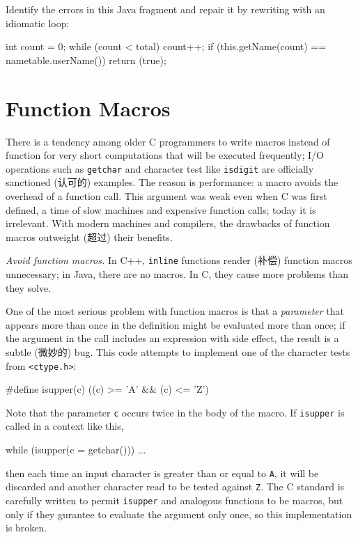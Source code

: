 \begin{exercise}
    Identify the errors in this Java fragment and repair it by rewriting
    with an idiomatic loop:
    \begin{badcode}
        int count = 0;
        while (count < total) {
            count++;
            if (this.getName(count) == nametable.userName()) {
                return (true);
            }
        }
    \end{badcode}
\end{exercise}

\section{Function Macros}
\label{sec:func_mac}
There is a tendency among older C programmers to write macros instead of
function for very short computations that will be executed frequently; I/O
operations such as \verb'getchar' and character test like \verb'isdigit'
are officially sanctioned (认可的) examples. The reason is performance: a
macro avoids the overhead of a function call. This argument was weak even
when C was first defined, a time of slow machines and expensive function
calls; today it is irrelevant. With modern machines and compilers, the
drawbacks of function macros outweight (超过) their benefits.

\emph{Avoid function macros.} In C++, \verb'inline' functions render (补偿)
function macros unnecessary; in Java, there are no macros. In C, they cause
more problems than they solve.

One of the most serious problem with function macros is that a
\textit{parameter} that appears more than once in the definition might be
evaluated more than once; if the argument in the call includes an
expression with side effect, the result is a subtle (微妙的) bug. This code
attempts to implement one of the character tests from \verb'<ctype.h>':
\begin{badcode}
    #define isupper(c) ((c) >= 'A' && (c) <= 'Z')
\end{badcode}
Note that the parameter \verb'c' occurs twice in the body of the macro. If
\verb'isupper' is called in a context like this,
\begin{badcode}
    while (isupper(c = getchar()))
        ...
\end{badcode}
then each time an input character is greater than or equal to \verb'A', it
will be discarded and another character read to be tested against \verb'Z'.
The C standard is carefully written to permit \verb'isupper' and analogous
functions to be macros, but only if they gurantee to evaluate the argument
only once, so this implementation is broken.

